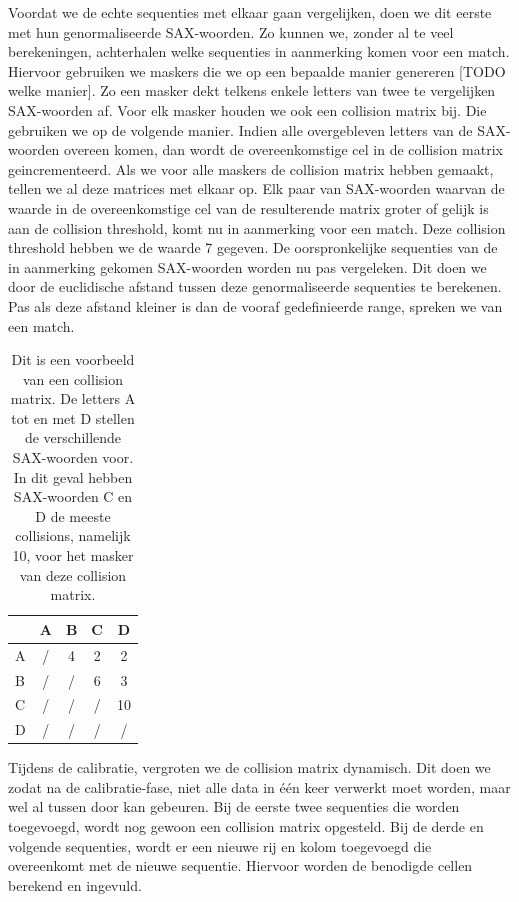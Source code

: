 \documentclass{article}
\begin{document}
Voordat we de echte sequenties met elkaar gaan vergelijken, doen we dit eerste met hun genormaliseerde SAX-woorden. Zo kunnen we, zonder al te veel berekeningen, achterhalen welke sequenties in aanmerking komen voor een match. Hiervoor gebruiken we maskers die we op een bepaalde manier genereren [TODO welke manier]. Zo een masker dekt telkens enkele letters van twee te vergelijken SAX-woorden af. Voor elk masker houden we ook een collision matrix bij. Die gebruiken we op de volgende manier. Indien alle overgebleven letters van de SAX-woorden overeen komen, dan wordt de overeenkomstige cel in de collision matrix geincrementeerd. Als we voor alle maskers de collision matrix hebben gemaakt, tellen we al deze matrices met elkaar op. Elk paar van SAX-woorden waarvan de waarde in de overeenkomstige cel van de resulterende matrix groter of gelijk is aan de collision threshold, komt nu in aanmerking voor een match. Deze collision threshold hebben we de waarde 7 gegeven. De oorspronkelijke sequenties van de in aanmerking gekomen SAX-woorden worden nu pas vergeleken. Dit doen we door de euclidische afstand tussen deze genormaliseerde sequenties te berekenen. Pas als deze afstand kleiner is dan de vooraf gedefinieerde range, spreken we van een match.

\begin{table}
\caption{Dit is een voorbeeld van een collision matrix. De letters A tot en met D stellen de verschillende SAX-woorden voor. In dit geval hebben SAX-woorden C en D de meeste collisions, namelijk 10, voor het masker van deze collision matrix.}
\centering
\begin{tabular}{ l || c | c | c | c }
& A & B & C & D \\ \hline
\hline
A & / & 4 & 2 & 2 \\ \hline
B & / & / & 6 & 3 \\ \hline
C & / & / & / & 10\\ \hline
D & / & / & / & / \\
\hline
\end{tabular}\par
\end{table}

Tijdens de calibratie, vergroten we de collision matrix dynamisch. Dit doen we zodat na de calibratie-fase, niet alle data in één keer verwerkt moet worden, maar wel al tussen door kan gebeuren. Bij de eerste twee sequenties die worden toegevoegd, wordt nog gewoon een collision matrix opgesteld. Bij de derde en volgende sequenties, wordt er een nieuwe rij en kolom toegevoegd die overeenkomt met de nieuwe sequentie. Hiervoor worden de benodigde cellen berekend en ingevuld.
\end{document}
